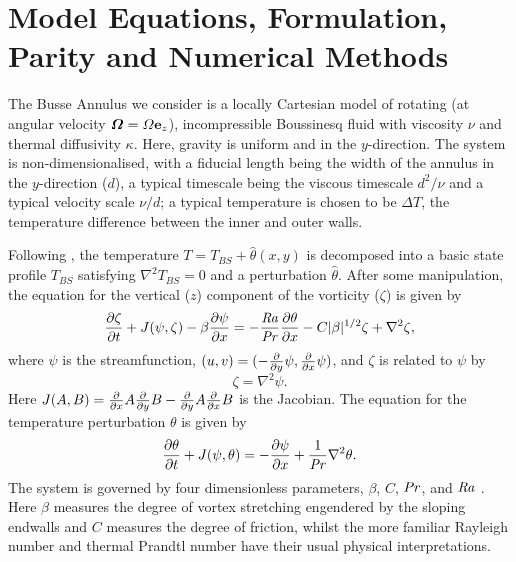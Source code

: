 \documentclass{jfm}
\newcommand{\laplacian}[1]{\nabla^2 #1}
\newcommand{\Rayleigh}{\mbox{\textit{Ra}}}  %
\begin{document}
\section{Model Equations, Formulation, Parity and Numerical Methods}
\label{sec:model-eqations}


The Busse Annulus we consider  is a locally Cartesian model of rotating (at angular velocity ${\boldsymbol \Omega = \Omega {\bf e}_z}$), incompressible Boussinesq fluid with viscosity $\nu$ and thermal diffusivity $\kappa$. Here, gravity is uniform and in the $y$-direction. 
The system is non-dimensionalised, with a fiducial length being the width of the annulus in the $y$-direction ($d$), a typical timescale being the viscous timescale $d^2/\nu$ and a typical velocity scale $\nu/d$; a typical temperature is chosen to be $\Delta T$, the temperature difference between the inner and outer walls. 

Following \citet{bh1993, rj2006}, 
the temperature  $T = T_{BS} +{\hat \theta(x,y)}$ is decomposed into a basic state profile $T_{BS}$ satisfying $\nabla^2 T_{BS} = 0$ and a perturbation ${\hat \theta}$. 
After some manipulation, the equation for the vertical ($z$) component of the vorticity ($\zeta$) is given by
\begin{equation}
  \label{eq:zeta_eom}
  \pdv{\zeta}{t} + J(\psi, \zeta) - \beta \pdv{\psi}{x} = -\frac{\Rayleigh}{\Pran} \pdv{\theta}{x} -C |\beta|^{1/2} \zeta + \laplacian{\zeta},
\end{equation}
where $\psi$ is the streamfunction, $(u,v) = (-\pdv*{\psi}{y}, \pdv*{\psi}{x})$, and $\zeta$ is related to $\psi$ by
\begin{equation}
  \label{eq:zeta_def}
  \zeta = \laplacian{\psi}.
\end{equation}
Here $J(A, B) = \pdv*{A}{x}\pdv*{B}{y} - \pdv*{A}{y}\pdv*{B}{x}$ is the Jacobian. 
The equation for the temperature perturbation  $\theta$ is given by
%
\begin{equation}
  \label{eq:theta}
  \pdv{\theta}{t} + J(\psi, \theta) = -\pdv{\psi}{x} + \frac{1}{\Pran} \nabla^2 \theta.
\end{equation}
The system is governed by four dimensionless parameters, $\beta$, $C$, $\Pran$, and $\Rayleigh$ \citep[see e.g.][for the definition of these parameters]{tom_2018}. Here $\beta$ measures the degree of vortex stretching engendered by the sloping endwalls and $C$ measures the degree of friction, whilst the more familiar Rayleigh number and thermal Prandtl number have their usual physical interpretations.
\end{document}
